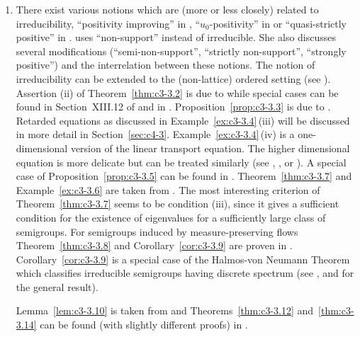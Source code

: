 \begin{enumerate}[label=\emph{Section 3.\arabic*:}, wide, itemsep=1ex]
\item
There exist various notions which are (more or less closely) related to irreducibility, \eg \enquote{positivity improving} in \textcite{reedsimon:1979}, \enquote{$u_0$-positivity} in 
\textcite{krasnoselskii:1964} or \enquote{quasi-strictly positive} in \textcite{karlin:1959}. \textcite{sawashima:1964} uses \enquote{non-support} instead of irreducible. 
She also discusses several modifications (\enquote{semi-non-support}, \enquote{strictly non-support}, \enquote{strongly positive}) and the interrelation between these notions. 
The notion of irreducibility can be extended to the (non-lattice) ordered setting (see \textcite{battyrobinson:1984}). 
Assertion \upshape(ii) of Theorem~\ref{thm:c3-3.2} is due to \textcite{majewskirobinson:1983} while special cases can be found in Section~XIII.12 of \textcite{reedsimon:1979} and in \textcite{kishimotorobinson:1981}. 
Proposition~\ref{prop:c3-3.3} is due to \textcite{voigt:1984a}. 
Retarded equations as discussed in Example~\ref{ex:c3-3.4}\,(iii) will be discussed in more detail in 
Section~\ref{sec:c4-3}.
Example~\ref{ex:c3-3.4}\,(iv) is a one-dimensional version of the linear transport equation. 
The higher dimensional equation is more delicate but can be treated similarly (see \eg \textcite{greiner:1984b}, \textcite{kaperetal:1983a}, or \textcite{voigt:1984b}). 
A special case of Proposition~\ref{prop:c3-3.5} can be found in \textcite{davies:1980}. 
Theorem~\ref{thm:c3-3.7} and Example~\ref{ex:c3-3.6} are taken from \textcite{schaefer:1985}. 
The most interesting criterion of Theorem~\ref{thm:c3-3.7} seems to be condition (iii), since it gives a sufficient condition for the existence of eigenvalues for a sufficiently large class of semigroups. 
For semigroups induced by measure-preserving flows Theorem~\ref{thm:c3-3.8} and Corollary~\ref{cor:c3-3.9} are proven in \textcite{cornfeldetal:1982}. 
Corollary~\ref{cor:c3-3.9} is a special case of the Halmos-von Neumann Theorem which classifies irreducible semigroups having discrete spectrum (see \textcite{cornfeldetal:1982}, \textcite{greiner:1982} and \textcite{schaefer:1974} for the general result). 

Lemma~\ref{lem:c3-3.10} is taken from \textcite{groh:1984b} and Theorems~\ref{thm:c3-3.12} and~\ref{thm:c3-3.14} can be found (with slightly different proofs) in \textcite{greiner:1981}. 


\end{enumerate}
